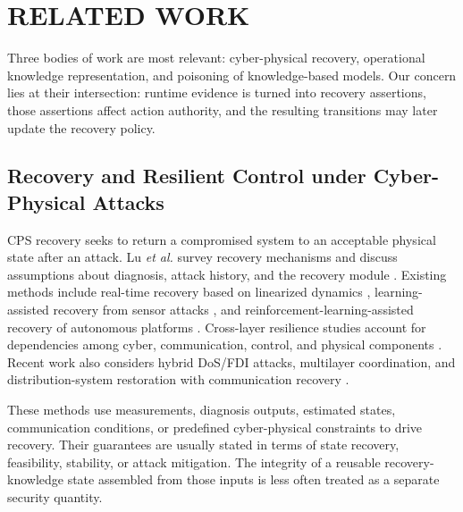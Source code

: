 \section{RELATED WORK}
\label{sec-related-work}
Three bodies of work are most relevant: cyber-physical recovery, operational knowledge representation, and poisoning of knowledge-based models. Our concern lies at their intersection: runtime evidence is turned into recovery assertions, those assertions affect action authority, and the resulting transitions may later update the recovery policy.

\subsection{Recovery and Resilient Control under Cyber-Physical Attacks}
CPS recovery seeks to return a compromised system to an acceptable physical state after an attack. Lu \emph{et al.} survey recovery mechanisms and discuss assumptions about diagnosis, attack history, and the recovery module \cite{lu2024recovery}. Existing methods include real-time recovery based on linearized dynamics \cite{zhang2020real}, learning-assisted recovery from sensor attacks \cite{akowuah2021recovery}, and reinforcement-learning-assisted recovery of autonomous platforms \cite{fei2020learn}. Cross-layer resilience studies account for dependencies among cyber, communication, control, and physical components \cite{zhu2020cross}. Recent work also considers hybrid DoS/FDI attacks, multilayer coordination, and distribution-system restoration with communication recovery \cite{game2026hybrid,liao2025surveyresilient,zhou2025faultresilient}.

These methods use measurements, diagnosis outputs, estimated states, communication conditions, or predefined cyber-physical constraints to drive recovery. Their guarantees are usually stated in terms of state recovery, feasibility, stability, or attack mitigation. The integrity of a reusable recovery-knowledge state assembled from those inputs is less often treated as a separate security quantity.

